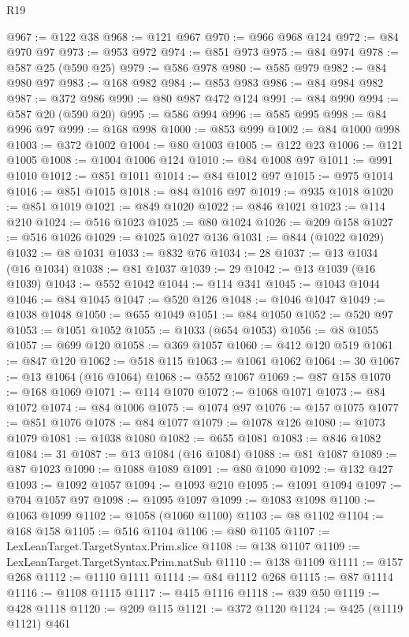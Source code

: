 \begin{lexlean}{R19}
\begin{coremodule}
{{{{{{{{{{{{{{{{{{{{{{{{{{{{{{{{{{{{{{{{{{{{{{{{{{{{{{{{{{{{{{{{{{{{{{{{{{{{{{{{{{{{{{{@967 := @122 @38
@968 := @121 @967
@970 := @966 @968 @124
@972 := @84 @970 @97
@973 := @953 @972
@974 := @851 @973
@975 := @84 @974
@978 := @587 @25 (@590 @25)
@979 := @586 @978
@980 := @585 @979
@982 := @84 @980 @97
@983 := @168 @982
@984 := @853 @983
@986 := @84 @984 @982
@987 := @372 @986
@990 := @80 @987 @472 @124
@991 := @84 @990
@994 := @587 @20 (@590 @20)
@995 := @586 @994
@996 := @585 @995
@998 := @84 @996 @97
@999 := @168 @998
@1000 := @853 @999
@1002 := @84 @1000 @998
@1003 := @372 @1002
@1004 := @80 @1003
@1005 := @122 @23
@1006 := @121 @1005
@1008 := @1004 @1006 @124
@1010 := @84 @1008 @97
@1011 := @991 @1010
@1012 := @851 @1011
@1014 := @84 @1012 @97
@1015 := @975 @1014
@1016 := @851 @1015
@1018 := @84 @1016 @97
@1019 := @935 @1018
@1020 := @851 @1019
@1021 := @849 @1020
@1022 := @846 @1021
@1023 := @114 @210
@1024 := @516 @1023
@1025 := @80 @1024
@1026 := @209 @158
@1027 := @516 @1026
@1029 := @1025 @1027 @136
@1031 := @844 (@1022 @1029)
@1032 := @8 @1031
@1033 := @832 @76
@1034 := 28
@1037 := @13 @1034 (@16 @1034)
@1038 := @81 @1037
@1039 := 29
@1042 := @13 @1039 (@16 @1039)
@1043 := @552 @1042
@1044 := @114 @341
@1045 := @1043 @1044
@1046 := @84 @1045
@1047 := @520 @126
@1048 := @1046 @1047
@1049 := @1038 @1048
@1050 := @655 @1049
@1051 := @84 @1050
@1052 := @520 @97
@1053 := @1051 @1052
@1055 := @1033 (@654 @1053)
@1056 := @8 @1055
@1057 := @699 @120
@1058 := @369 @1057
@1060 := @412 @120 @519
@1061 := @847 @120
@1062 := @518 @115
@1063 := @1061 @1062
@1064 := 30
@1067 := @13 @1064 (@16 @1064)
@1068 := @552 @1067
@1069 := @87 @158
@1070 := @168 @1069
@1071 := @114 @1070
@1072 := @1068 @1071
@1073 := @84 @1072
@1074 := @84 @1006
@1075 := @1074 @97
@1076 := @157 @1075
@1077 := @851 @1076
@1078 := @84 @1077
@1079 := @1078 @126
@1080 := @1073 @1079
@1081 := @1038 @1080
@1082 := @655 @1081
@1083 := @846 @1082
@1084 := 31
@1087 := @13 @1084 (@16 @1084)
@1088 := @81 @1087
@1089 := @87 @1023
@1090 := @1088 @1089
@1091 := @80 @1090
@1092 := @132 @427
@1093 := @1092 @1057
@1094 := @1093 @210
@1095 := @1091 @1094
@1097 := @704 @1057 @97
@1098 := @1095 @1097
@1099 := @1083 @1098
@1100 := @1063 @1099
@1102 := @1058 (@1060 @1100)
@1103 := @8 @1102
@1104 := @168 @158
@1105 := @516 @1104
@1106 := @80 @1105
@1107 := LexLeanTarget.TargetSyntax.Prim.slice
@1108 := @138 @1107
@1109 := LexLeanTarget.TargetSyntax.Prim.natSub
@1110 := @138 @1109
@1111 := @157 @268
@1112 := @1110 @1111
@1114 := @84 @1112 @268
@1115 := @87 @1114
@1116 := @1108 @1115
@1117 := @415 @1116
@1118 := @39 @50
@1119 := @428 @1118
@1120 := @209 @115
@1121 := @372 @1120
@1124 := @425 (@1119 @1121) @461
}}}}}}}}}}}}}}}}}}}}}}}}}}}}}}}}}}}}}}}}}}}}}}}}}}}}}}}}}}}}}}}}}}}}}}}}}}}}}}}}}}}}}}}
\end{coremodule}
\end{lexlean}
